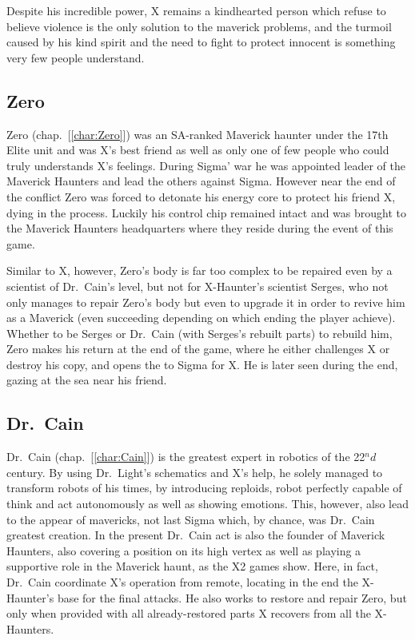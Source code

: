 Despite his incredible power, X remains a kindhearted person which refuse to believe violence is the only solution to the maverick problems, and the turmoil caused by his kind spirit and the need to fight to protect innocent is something very few people understand\cite{Xcoll1:Manual_X2}.

\subsection{Zero}
Zero (chap.~[\ref{char:Zero}]) was an SA-ranked Maverick haunter under the 17th Elite unit and was X's best friend as well as only one of few people who could truly understands X's feelings. During Sigma' war he was appointed leader of the Maverick Haunters and lead the others against Sigma. However near the end of the conflict Zero was forced to detonate his energy core to protect his friend X, dying in the process. Luckily his control chip remained intact and was brought to the Maverick Haunters headquarters where they reside during the event of this game.

Similar to X, however, Zero's body is far too complex to be repaired even by a scientist of Dr.~Cain's level, but not for X-Haunter's scientist Serges, who not only manages to repair Zero's body but even to upgrade it in order to revive him as a Maverick\cite{wayback:X2_resources} (even succeeding depending on which ending the player achieve). Whether to be Serges or Dr.~Cain (with Serges's rebuilt parts) to rebuild him, Zero makes his return at the end of the game, where he either challenges X or destroy his copy, and opens the to Sigma for X. He is later seen during the end, gazing at the sea near his friend.


\subsection{Dr.~Cain}
Dr.~Cain (chap.~[\ref{char:Cain}]) is the greatest expert in robotics of the 22$^nd$ century\cite{Xcoll1:Manual_X2}. By using Dr.~Light's schematics and X's help, he solely managed to transform robots of his times, by introducing reploids, robot perfectly capable of think and act autonomously as well as showing emotions. This, however, also lead to the appear of mavericks, not last Sigma which, by chance, was Dr.~Cain greatest creation. In the present Dr.~Cain act is also the founder of Maverick Haunters, also covering a position on its high vertex as well as playing a supportive role in the Maverick haunt, as the X2 games show. Here, in fact, Dr.~Cain coordinate X's operation from remote, locating in the end the X-Haunter's base for the final attacks. He also works to restore and repair Zero, but only when provided with all already-restored parts X recovers from all the X-Haunters.

